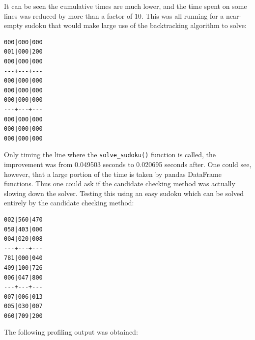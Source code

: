 \documentclass[12pt]{report} %
\begin{document}
It can be seen the cumulative times are much lower, and the time spent on some lines was reduced by more than a factor of 10. This was all running for a near-empty sudoku that would make large use of the backtracking algorithm to solve:

\begin{lstlisting}[caption = {sudoku\_near\_empty.txt}]
000|000|000
001|000|200
000|000|000
---+---+---
000|000|000
000|000|000
000|000|000
---+---+---
000|000|000
000|000|000
000|000|000
\end{lstlisting}

Only timing the line where the \texttt{solve\_sudoku()} function is called, the improvement was from 0.049503 seconds to 0.020695 seconds after. One could see, however, that a large portion of the time is taken by pandas DataFrame functions. Thus one could ask if the candidate checking method was actually slowing down the solver. Testing this using an easy sudoku which can be solved entirely by the candidate checking method:

\begin{lstlisting}[caption= {sudoku\_easy.txt}]
002|560|470
058|403|000
004|020|008
---+---+---
781|000|040
409|100|726
006|047|800
---+---+---
007|006|013
005|030|007
060|709|200
\end{lstlisting}

The following profiling output was obtained:
\end{document}
